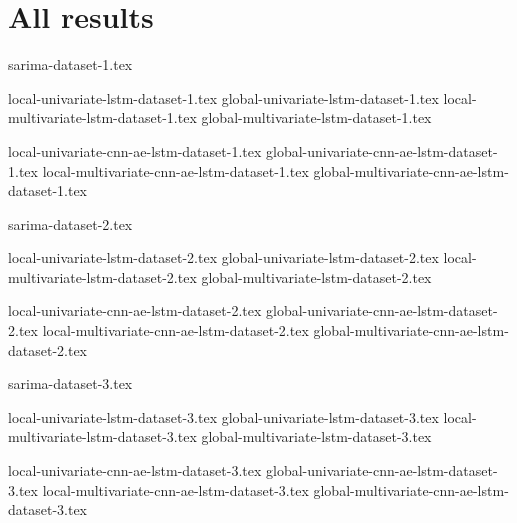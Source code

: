 
\section{All results}
\label{cha:All results}


{sarima-dataset-1.tex}

{local-univariate-lstm-dataset-1.tex}
{global-univariate-lstm-dataset-1.tex}
{local-multivariate-lstm-dataset-1.tex}
{global-multivariate-lstm-dataset-1.tex}


{local-univariate-cnn-ae-lstm-dataset-1.tex}
{global-univariate-cnn-ae-lstm-dataset-1.tex}
{local-multivariate-cnn-ae-lstm-dataset-1.tex}
{global-multivariate-cnn-ae-lstm-dataset-1.tex}


{sarima-dataset-2.tex}

{local-univariate-lstm-dataset-2.tex}
{global-univariate-lstm-dataset-2.tex}
{local-multivariate-lstm-dataset-2.tex}
{global-multivariate-lstm-dataset-2.tex}

{local-univariate-cnn-ae-lstm-dataset-2.tex}
{global-univariate-cnn-ae-lstm-dataset-2.tex}
{local-multivariate-cnn-ae-lstm-dataset-2.tex}
{global-multivariate-cnn-ae-lstm-dataset-2.tex}

{sarima-dataset-3.tex}

{local-univariate-lstm-dataset-3.tex}
{global-univariate-lstm-dataset-3.tex}
{local-multivariate-lstm-dataset-3.tex}
{global-multivariate-lstm-dataset-3.tex}

{local-univariate-cnn-ae-lstm-dataset-3.tex}
{global-univariate-cnn-ae-lstm-dataset-3.tex}
{local-multivariate-cnn-ae-lstm-dataset-3.tex}
{global-multivariate-cnn-ae-lstm-dataset-3.tex}

\iffalse
\fi